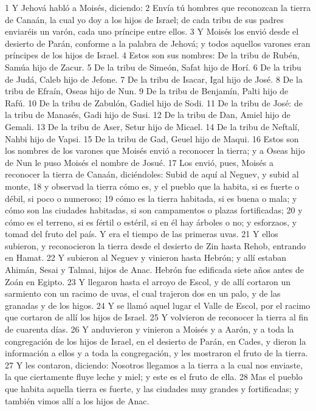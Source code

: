 1 Y Jehová habló a Moisés, diciendo:
2 Envía tú hombres que reconozcan la tierra de Canaán, la cual yo doy a los hijos de Israel; de cada tribu de sus padres enviaréis un varón, cada uno príncipe entre ellos.
3 Y Moisés los envió desde el desierto de Parán, conforme a la palabra de Jehová; y todos aquellos varones eran príncipes de los hijos de Israel.
4 Estos son sus nombres: De la tribu de Rubén, Samúa hijo de Zacur.
5 De la tribu de Simeón, Safat hijo de Horí.
6 De la tribu de Judá, Caleb hijo de Jefone.
7 De la tribu de Isacar, Igal hijo de José.
8 De la tribu de Efraín, Oseas hijo de Nun.
9 De la tribu de Benjamín, Palti hijo de Rafú.
10 De la tribu de Zabulón, Gadiel hijo de Sodi.
11 De la tribu de José: de la tribu de Manasés, Gadi hijo de Susi.
12 De la tribu de Dan, Amiel hijo de Gemali.
13 De la tribu de Aser, Setur hijo de Micael.
14 De la tribu de Neftalí, Nahbi hijo de Vapsi. 
15 De la tribu de Gad, Geuel hijo de Maqui.
16 Estos son los nombres de los varones que Moisés envió a reconocer la tierra; y a Oseas hijo de Nun le puso Moisés el nombre de Josué.
17 Los envió, pues, Moisés a reconocer la tierra de Canaán, diciéndoles: Subid de aquí al Neguev, y subid al monte,
18 y observad la tierra cómo es, y el pueblo que la habita, si es fuerte o débil, si poco o numeroso;
19 cómo es la tierra habitada, si es buena o mala; y cómo son las ciudades habitadas, si son campamentos o plazas fortificadas;
20 y cómo es el terreno, si es fértil o estéril, si en él hay árboles o no; y esforzaos, y tomad del fruto del país. Y era el tiempo de las primeras uvas.
21 Y ellos subieron, y reconocieron la tierra desde el desierto de Zin hasta Rehob, entrando en Hamat.
22 Y subieron al Neguev y vinieron hasta Hebrón; y allí estaban Ahimán, Sesai y Talmai, hijos de Anac. Hebrón fue edificada siete años antes de Zoán en Egipto.
23 Y llegaron hasta el arroyo de Escol, y de allí cortaron un sarmiento con un racimo de uvas, el cual trajeron dos en un palo, y de las granadas y de los higos.
24 Y se llamó aquel lugar el Valle de Escol, por el racimo que cortaron de allí los hijos de Israel.
25 Y volvieron de reconocer la tierra al fin de cuarenta días.
26 Y anduvieron y vinieron a Moisés y a Aarón, y a toda la congregación de los hijos de Israel, en el desierto de Parán, en Cades, y dieron la información a ellos y a toda la congregación, y les mostraron el fruto de la tierra.
27 Y les contaron, diciendo: Nosotros llegamos a la tierra a la cual nos enviaste, la que ciertamente fluye leche y miel; y este es el fruto de ella.
28 Mas el pueblo que habita aquella tierra es fuerte, y las ciudades muy grandes y fortificadas; y también vimos allí a los hijos de Anac.
